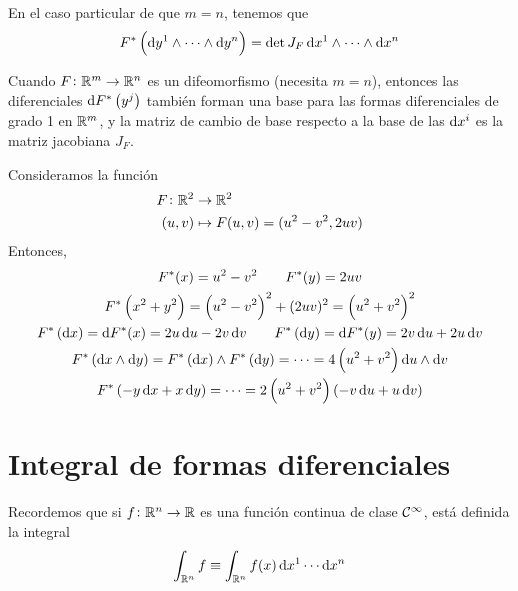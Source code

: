 \begin{obs}
    En el caso particular de que $m=n$, tenemos que
    \[
        F^\ast \left( \dif y^1 \wedge \cdots \wedge \dif y^n \right) = \det J_F \dif x^1 \wedge \cdots \wedge \dif x^n
    \]
\end{obs}

\begin{prop}
    Cuando $F \colon \mathbb{R}^m \to \mathbb{R}^n$ es un difeomorfismo (necesita $m=n$), entonces las diferenciales $\dif F^\ast \left( y^j \right)$
    tambi\'en forman una base para las formas diferenciales de grado 1 en $\mathbb{R}^m$, y la matriz de cambio de base respecto a la base de las
    $\dif x^i$ es la matriz jacobiana $J_F$.
\end{prop}

\begin{example*}
    Consideramos la función
    \[
        \begin{aligned}
            F \colon \mathbb{R}^2 &\to \mathbb{R}^2 \\
            (u,v) &\mapsto F(u,v) = (u^2 - v^2, 2uv)
        \end{aligned}
    \]
    Entonces,
    \begin{gather*}
        F^\ast(x) = u^2 - v^2 \qquad F^\ast(y) = 2uv \\
        F^\ast \left( x^2 + y^2 \right) = \left(u^2 - v^2\right)^2 + (2uv)^2 = \left(u^2 +v^2\right)^2 \\
        F^\ast\left( \dif x \right) = \dif F^\ast(x) = 2u\dif u - 2v\dif v
        \qquad
        F^\ast\left( \dif y \right) = \dif F^\ast (y) = 2v \dif u + 2u \dif v \\
        F^\ast\left( \dif x \wedge \dif y \right) = F^\ast\left( \dif x \right) \wedge F^\ast\left( \dif y \right) = \cdots =
        4 \left( u^2 + v^2 \right) \dif u \wedge \dif v \\
        F^\ast\left( -y\dif x + x \dif y\right) = \cdots = 2 \left( u^2 + v^2 \right) \left( -v \dif u + u \dif v \right)
    \end{gather*}
\end{example*}

\section{Integral de formas diferenciales}

\begin{obs}
    Recordemos que si $f \colon \mathbb{R}^n \to \mathbb{R}$ es una función continua de clase $\mathcal{C}^\infty$, está definida la integral
    \[
        \int_{\real^n} f \equiv \int_{\real^n} f(x) \dif x^1 \cdots \dif x^n
    \]
\end{obs}

